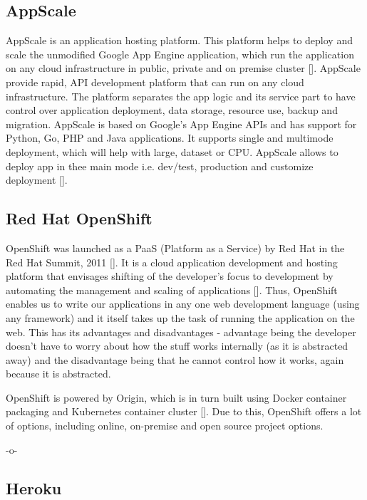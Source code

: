 \subsection{AppScale}

AppScale is an application hosting platform. This platform helps to
deploy and scale the unmodified Google App Engine application, which
run the application on any cloud infrastructure in public, private and
on premise cluster [\cite{www-appscale}]. AppScale provide rapid, API
development platform that can run on any cloud infrastructure. The
platform separates the app logic and its service part to have control
over application deployment, data storage, resource use, backup and
migration.  AppScale is based on Google's App Engine APIs and has
support for Python, Go, PHP and Java applications. It supports single
and multimode deployment, which will help with large, dataset or
CPU. AppScale allows to deploy app in thee main mode i.e. dev/test,
production and customize deployment [\cite{www-appscale-deployment}].

\subsection{Red Hat OpenShift}

OpenShift was launched as a PaaS (Platform as a Service) by Red Hat in
the Red Hat Summit, 2011 [\cite{www-paas-openshift}].  It is a cloud
application development and hosting platform that envisages shifting
of the developer's focus to development by automating the management
and scaling of applications [\cite{www-developers-openshift}].  Thus,
OpenShift enables us to write our applications in any one web
development language (using any framework) and it itself takes up the
task of running the application on the web\cite{www-openshift}.  This
has its advantages and disadvantages - advantage being the developer
doesn't have to worry about how the stuff works internally (as it is
abstracted away) and the disadvantage being that he cannot control how
it works, again because it is abstracted.

OpenShift is powered by Origin, which is in turn built using Docker
container packaging and Kubernetes container
cluster [\cite{www-openshift-blog}].  Due to this, OpenShift offers a
lot of options, including online, on-premise and open source project
options.

    -o-
    
\subsection{Heroku}

